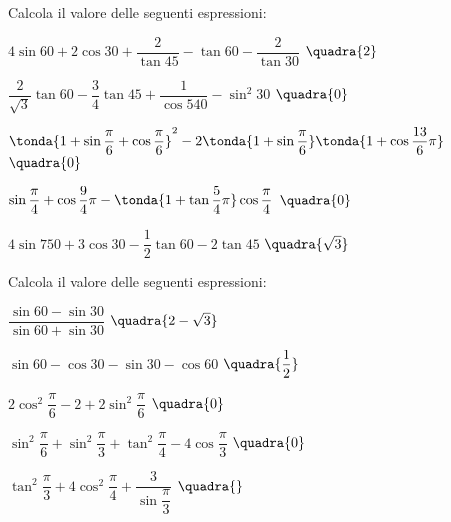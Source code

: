 \begin{esercizio}\label{ese:03.1}
Calcola il valore delle seguenti espressioni:
 \begin{enumeratea}
  \item  \(4 \sin 60 + 2 \cos 30 + \dfrac{2}{\tan 45} - 
          \tan 60 - \dfrac{2}{\tan 30}\)
   \hfill \(\quadra{2}\)
  \item  \(\dfrac{2}{\sqrt{3}} \tan 60 - \dfrac{3}{4} \tan 45 + 
          \dfrac{1}{\cos 540} - \sin^2 30 \)
   \hfill \(\quadra{0}\)
  \item  \(\tonda{1 + \sin \dfrac{\pi}{6} + \cos \dfrac{\pi}{6}}^2 -
          2 \tonda{1 + \sin \dfrac{\pi}{6}} \tonda{1 + \cos \dfrac{13}{6}\pi}\)
   \hfill \(\quadra{0}\)
  \item  \(\sin \dfrac{\pi}{4} + \cos \dfrac{9}{4}\pi - 
          \tonda{1 + \tan \dfrac{5}{4}\pi} \cos \dfrac{\pi}{4}\)
   \hfill \(\quadra{0}\)
  \item  \(4 \sin 750 + 3 \cos 30 - \dfrac{1}{2} \tan 60 - 2 \tan 45\)
   \hfill \(\quadra{\sqrt{3}}\)
 \end{enumeratea}
\end{esercizio}

\begin{esercizio}\label{ese:}
 Calcola il valore delle seguenti espressioni:
 \begin{enumeratea}
  \item  \(\dfrac{\sin 60 - \sin 30}{\sin 60 + \sin 30}\)
   \hfill \(\quadra{2 - \sqrt{3}}\)
  \item  \(\sin 60 - \cos 30 - \sin 30 - \cos 60\)
   \hfill \(\quadra{\dfrac{1}{2}}\)
  \item  \(2 \cos^2 \dfrac{\pi}{6} - 2 + 2 \sin^2 \dfrac{\pi}{6}\)
   \hfill \(\quadra{0}\)
  \item  \(\sin^2 \dfrac{\pi}{6} + \sin^2 \dfrac{\pi}{3} +
          \tan^2 \dfrac{\pi}{4} - 4 \cos \dfrac{\pi}{3}\)
   \hfill \(\quadra{0}\)
  \item  \(\tan^2 \dfrac{\pi}{3} + 4 \cos^2 \dfrac{\pi}{4} + 
          \dfrac{3}{\sin \dfrac{\pi}{3}}\)
   \hfill \(\quadra{}\)
 \end{enumeratea}
\end{esercizio}

